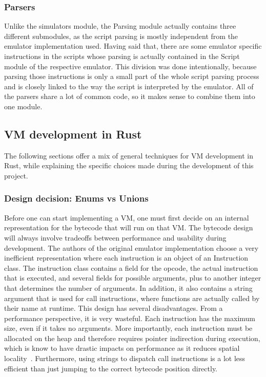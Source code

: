\subsubsection{Parsers}
Unlike the simulators module, the Parsing module actually contains three different submodules, as the script parsing is mostly independent from the emulator implementation used.
Having said that, there are some emulator specific instructions in the scripts whose parsing is actually contained in the Script module of the respective emulator. This division was done intentionally, because parsing those instructions is only a small part of the whole script parsing process and is closely linked to the way the script is interpreted by the emulator.
All of the parsers share a lot of common code, so it makes sense to combine them into one module.

\subsection{VM development in Rust} \label{rust-vm-dev}
The following sections offer a mix of general techniques for VM development in Rust, while explaining the specific choices made during the development of this project.

\subsubsection{Design decision: Enums vs Unions}
Before one can start implementing a VM, one must first decide on an internal representation for the bytecode that will run on that VM.
The bytecode design will always involve tradeoffs between performance and usability during development.
The authors of the original emulator implementation choose a very inefficient representation where each instruction is an object of an Instruction class. The instruction class contains a field for the opcode, the actual instruction that is executed, and several fields for possible arguments, plus to another integer that determines the number of arguments.
In addition, it also contains a string argument that is used for call instructions, where functions are actually called by their name at runtime.
This design has several disadvantages. From a performance perspective, it is very wasteful. Each instruction has the maximum size, even if it takes no arguments. More importantly, each instruction must be allocated on the heap and therefore requires pointer indirection during execution, which is know to have drastic impacts on performance as it reduces spatial locality~\cite{6498541}.
Furthermore, using strings to dispatch call instructions is a lot less efficient than just jumping to the correct bytecode position directly.

